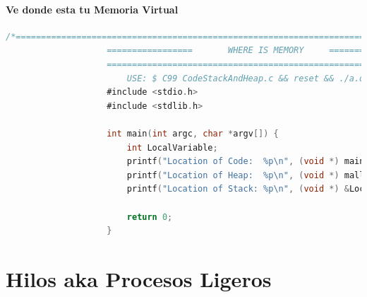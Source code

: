 \documentclass[12pt, fleqn]{report}                             %
\begin{document}
            \subsubsection{Ve donde esta tu Memoria Virtual}
                \begin{lstlisting}[language=C, gobble=20]
                    /*=======================================================================
                    =================       WHERE IS MEMORY     =============================
                    =========================================================================
                        USE: $ C99 CodeStackAndHeap.c && reset && ./a.out                  */
                    #include <stdio.h>                                              //We will need this
                    #include <stdlib.h>                                             //We will need this        

                    int main(int argc, char *argv[]) {                              //Fucking main
                        int LocalVariable;                                          //A var in stack
                        printf("Location of Code:  %p\n", (void *) main);           //Show direction for code
                        printf("Location of Heap:  %p\n", (void *) malloc(1));      //Show direction for heap
                        printf("Location of Stack: %p\n", (void *) &LocalVariable); //Show direction for stack
                        
                        return 0;                                                   //Go little program
                    }
                \end{lstlisting}


                    

    \chapter{Hilos aka Procesos Ligeros}

        \clearpage
\end{document}
